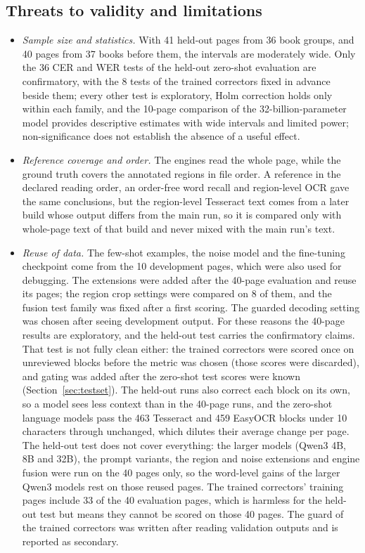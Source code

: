 \documentclass[conference]{IEEEtran}
\begin{document}
\subsection{Threats to validity and limitations}
\begin{itemize}
\item \emph{Sample size and statistics.} With 41 held-out pages from 36 book groups, and 40 pages from 37 books before them, the intervals are moderately wide. Only the 36 CER and WER tests of the held-out zero-shot evaluation are confirmatory, with the 8 tests of the trained correctors fixed in advance beside them; every other test is exploratory, Holm correction holds only within each family, and the 10-page comparison of the 32-billion-parameter model provides descriptive estimates with wide intervals and limited power; non-significance does not establish the absence of a useful effect.
\item \emph{Reference coverage and order.} The engines read the whole page, while the ground truth covers the annotated regions in file order. A reference in the declared reading order, an order-free word recall and region-level OCR gave the same conclusions, but the region-level Tesseract text comes from a later build whose output differs from the main run, so it is compared only with whole-page text of that build and never mixed with the main run's text.
\item \emph{Reuse of data.} The few-shot examples, the noise model and the fine-tuning checkpoint come from the 10 development pages, which were also used for debugging. The extensions were added after the 40-page evaluation and reuse its pages; the region crop settings were compared on 8 of them, and the fusion test family was fixed after a first scoring. The guarded decoding setting was chosen after seeing development output. For these reasons the 40-page results are exploratory, and the held-out test carries the confirmatory claims. That test is not fully clean either: the trained correctors were scored once on unreviewed blocks before the metric was chosen (those scores were discarded), and gating was added after the zero-shot test scores were known (Section~\ref{sec:testset}). The held-out runs also correct each block on its own, so a model sees less context than in the 40-page runs, and the zero-shot language models pass the 463 Tesseract and 459 EasyOCR blocks under 10 characters through unchanged, which dilutes their average change per page. The held-out test does not cover everything: the larger models (Qwen3 4B, 8B and 32B), the prompt variants, the region and noise extensions and engine fusion were run on the 40 pages only, so the word-level gains of the larger Qwen3 models rest on those reused pages. The trained correctors' training pages include 33 of the 40 evaluation pages, which is harmless for the held-out test but means they cannot be scored on those 40 pages. The guard of the trained correctors was written after reading validation outputs and is reported as secondary.

\end{itemize}
\end{document}
